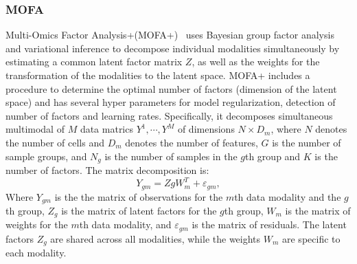 \subsubsection{MOFA}
Multi-Omics Factor Analysis+(MOFA+)~\cite{argelaguet2020mofa+} uses Bayesian group factor analysis and variational inference to decompose individual modalities simultaneously by estimating a common latent factor matrix $Z$, as well as the weights for the transformation of the modalities to the latent space. MOFA+ includes a procedure to determine the optimal number of factors (dimension of the latent space) and has several hyper parameters for model regularization, detection of number of factors and learning rates. Specifically, it decomposes simultaneous multimodal of $M$ data matrics $Y^1, \cdots, Y^M$ of dimensions $N\times D_m$, where $N$ denotes the number of cells and $D_m$ denotes the number of features, $G$ is the number of sample groups, and $N_g$ is the number of samples in the $g$th group and $K$ is the number of factors. The matrix decomposition is:
\begin{equation}
Y_{gm} = ZgW_m^{T} + \varepsilon_{gm}, 
\end{equation}
Where $Y_{gm}$ is the the matrix of observations for the $m$th data modality and the $g$th group, $Z_g$ is the matrix of latent factors for the $g$th group, $W_m$ is the matrix of weights for the $m$th data modality, and $\varepsilon_{gm}$ is the matrix of residuals. The latent factors $Z_g$ are shared across all modalities, while the weights $W_m$ are specific to each modality. %



